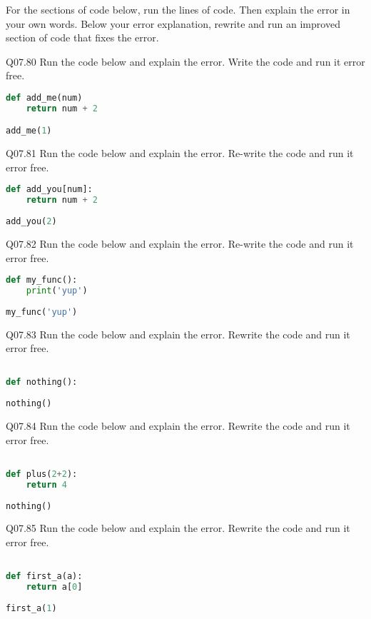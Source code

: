 \documentclass{book}
\begin{document}
For the sections of code below, run the lines of code. Then explain the
error in your own words. Below your error explanation, rewrite and run
an improved section of code that fixes the error.

Q07.80 Run the code below and explain the error. Write the code and run
it error free.

\begin{lstlisting}[language=Python]
def add_me(num)
    return num + 2

add_me(1)
\end{lstlisting}

Q07.81 Run the code below and explain the error. Re-write the code and
run it error free.

\begin{lstlisting}[language=Python]
def add_you[num]:
    return num + 2
    
add_you(2)
\end{lstlisting}

Q07.82 Run the code below and explain the error. Re-write the code and
run it error free.

\begin{lstlisting}[language=Python]
def my_func():
    print('yup')
    
my_func('yup')
\end{lstlisting}

Q07.83 Run the code below and explain the error. Rewrite the code and
run it error free.

\begin{lstlisting}[language=Python]

def nothing():
    
nothing()
\end{lstlisting}

Q07.84 Run the code below and explain the error. Rewrite the code and
run it error free.

\begin{lstlisting}[language=Python]

def plus(2+2):
    return 4 
    
nothing()
\end{lstlisting}

Q07.85 Run the code below and explain the error. Rewrite the code and
run it error free.

\begin{lstlisting}[language=Python]

def first_a(a):
    return a[0]
    
first_a(1)
\end{lstlisting}
    
\end{document}
